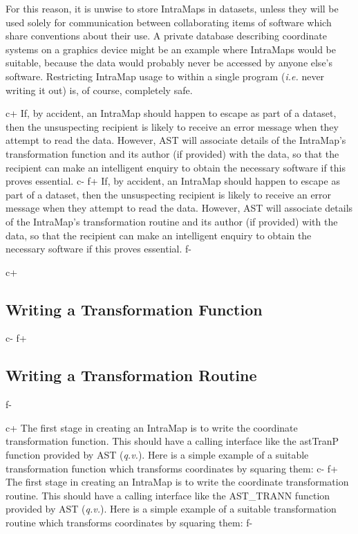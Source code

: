 \documentclass[twoside,11pt]{starlink}
\begin{document}
For this reason, it is unwise to store IntraMaps in datasets, unless
they will be used solely for communication between collaborating items
of software which share conventions about their use.  A private
database describing coordinate systems on a graphics device might be
an example where IntraMaps would be suitable, because the data would
probably never be accessed by anyone else's software. Restricting
IntraMap usage to within a single program (\emph{i.e.} never writing
it out) is, of course, completely safe.

c+
If, by accident, an IntraMap should happen to escape as part of a
dataset, then the unsuspecting recipient is likely to receive an error
message when they attempt to read the data. However, AST will
associate details of the IntraMap's transformation function and its
author (if provided) with the data, so that the recipient can make an
intelligent enquiry to obtain the necessary software if this proves
essential.
c-
f+
If, by accident, an IntraMap should happen to escape as part of a
dataset, then the unsuspecting recipient is likely to receive an error
message when they attempt to read the data. However, AST will
associate details of the IntraMap's transformation routine and its
author (if provided) with the data, so that the recipient can make an
intelligent enquiry to obtain the necessary software if this proves
essential.
f-

c+
\subsection{\label{ss:transformationfunctions}Writing a Transformation Function}
c-
f+
\subsection{\label{ss:transformationfunctions}Writing a Transformation Routine}
f-

c+
The first stage in creating an IntraMap is to write the coordinate
transformation function. This should have a calling interface like the
astTranP function provided by AST (\emph{q.v.}). Here is a simple
example of a suitable transformation function which transforms
coordinates by squaring them:
c-
f+
The first stage in creating an IntraMap is to write the coordinate
transformation routine. This should have a calling interface like the
AST\_TRANN function provided by AST (\emph{q.v.}). Here is a simple
example of a suitable transformation routine which transforms
coordinates by squaring them:
f-
\end{document}
